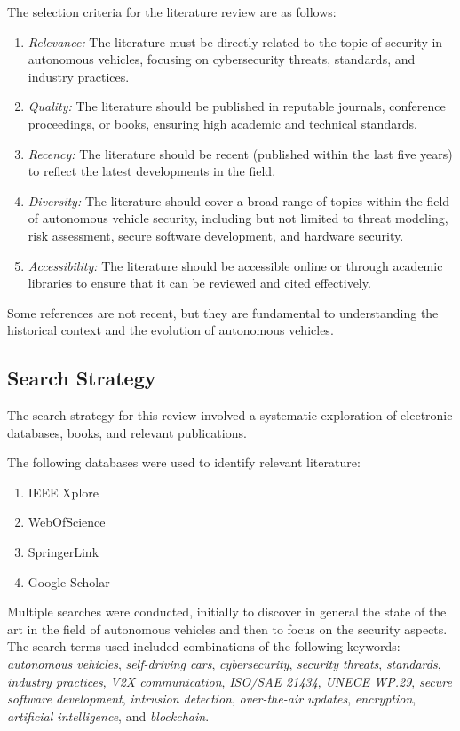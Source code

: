 The selection criteria for the literature review are as follows:
\begin{enumerate}
    \item \textit{Relevance:} The literature must be directly related to the topic of security in autonomous vehicles, focusing on cybersecurity threats, standards, and industry practices.
    \item \textit{Quality:} The literature should be published in reputable journals, conference proceedings, or books, ensuring high academic and technical standards.
    \item \textit{Recency:} The literature should be recent (published within the last five years) to reflect the latest developments in the field.
    \item \textit{Diversity:} The literature should cover a broad range of topics within the field of autonomous vehicle security, including but not limited to threat modeling, risk assessment, secure software development, and hardware security.
    \item \textit{Accessibility:} The literature should be accessible online or through academic libraries to ensure that it can be reviewed and cited effectively.
\end{enumerate}

Some references are not recent, but they are fundamental to understanding the historical context and the evolution of autonomous vehicles.

\subsection{Search Strategy}\label{subsec:search-strategy}

The search strategy for this review involved a systematic exploration of electronic databases, books, and relevant publications.

The following databases were used to identify relevant literature:

\begin{enumerate}
    \item IEEE Xplore
    \item WebOfScience
    \item SpringerLink
    \item Google Scholar
\end{enumerate}

Multiple searches were conducted, initially to discover in general the state of the art in the field of autonomous vehicles and then to focus on the security aspects.
The search terms used included combinations of the following keywords:
\textit{autonomous vehicles}, \textit{self-driving cars}, \textit{cybersecurity}, \textit{security threats}, \textit{standards}, \textit{industry practices}, \textit{V2X communication}, \textit{ISO/SAE 21434}, \textit{UNECE WP.29}, \textit{secure software development}, \textit{intrusion detection}, \textit{over-the-air updates}, \textit{encryption}, \textit{artificial intelligence}, and \textit{blockchain}.

